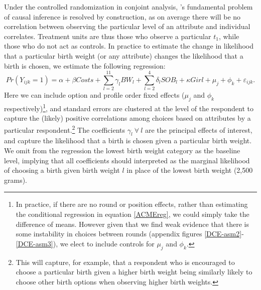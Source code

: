 \documentclass[a4paper, 11pt]{article}
\begin{document}
\begin{spacing}{1.4}
Under the controlled randomization in conjoint analysis, \citet{Holland1986}'s
fundamental problem of causal inference is resolved by construction, as on
average there will be no correlation between observing the particular level
of an attribute and individual correlates. Treatment units are thus those who
observe a particular $t_1$, while those who do not act as controls.  In
practice to estimate the change in likelihood that a particular birth weight
(or any attribute) changes the likelihood that a birth is chosen, we estimate
the following regression:
\begin{equation}
  \label{ACMEreg}
Pr(Y_{ijk}=1) = \alpha + \beta Costs + \sum_{l=2}^{11} \gamma_l BW_l + \sum_{l=2}^{4} \delta_l SOB_l +  \kappa Girl + \mu_j + \phi_k + \varepsilon_{ijk}.
\end{equation}
Here we can include option and profile order fixed effects ($\mu_j$ and
$\phi_k$ respectively)\footnote{In practice, if there are no round
or position effects, rather than estimating the conditional regression in
equation \ref{ACMEreg}, we could simply take the difference of means. However
given that we find weak evidence that there is some instability in choices
between rounds (appendix figures \ref{DCE-asm2}-\ref{DCE-asm3}), we elect to
include controls for $\mu_j$ and $\phi_k$.}, and standard errors are clustered
at the level of the respondent to capture the (likely) positive correlations
among choices based on attributes by a particular respondent.\footnote{This
  will capture, for example, that a respondent who is encouraged to choose
  a particular birth given a higher birth weight being similarly likely to
  choose other birth options when observing higher birth weights.} The
coefficients $\gamma_l \ \forall\ l$ are the principal effects of interest,
and capture the likelihood that a birth is chosen given a particular birth
weight.  We omit from the regression the lowest birth weight category as the
baseline level, implying that all coefficients should interpreted as the
marginal likelihood of choosing a birth given birth weight $l$ in place of
the lowest birth weight (2,500 grams).


\end{spacing}
\end{document}
